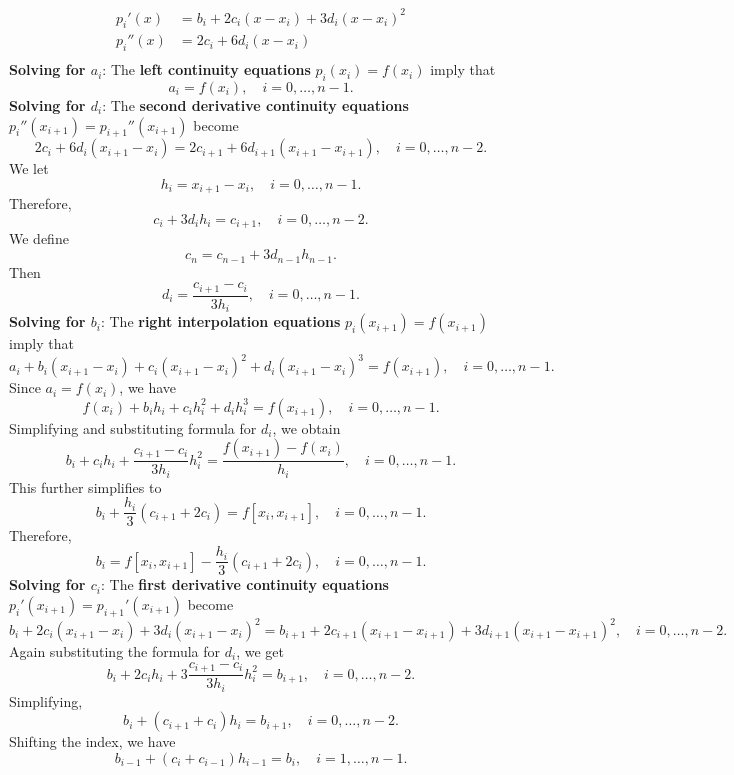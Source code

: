 \documentclass{report}
\begin{document}
\begin{itemize}
\begin{align*}
                p_i'(x) &= b_i + 2c_i(x-x_i) + 3d_i(x-x_i)^2\\
                p_i''(x) &= 2c_i + 6d_i(x-x_i)\\
            \end{align*}
            \textbf{Solving for $a_{i}$}: The \textbf{left continuity equations} $p_i(x_i) = f(x_i)$ imply that
            $$a_i = f(x_i), \quad i=0,\ldots,n-1.$$
            \bigbreak \noindent 
            \textbf{Solving for $d_{i}$}: The \textbf{second derivative continuity equations} $p_i''(x_{i+1}) = p_{i+1}''(x_{i+1})$ become
            $$2c_i + 6d_i(x_{i+1}-x_i) = 2c_{i+1} + 6d_{i+1}(x_{i+1}-x_{i+1}), \quad i=0,\ldots,n-2.$$
            We let 
            $$h_i = x_{i+1} - x_i, \quad i=0,\ldots,n-1.$$ 
            Therefore,
            $$c_i + 3d_i h_i = c_{i+1}, \quad i=0,\ldots,n-2.$$
            We define 
            $$c_n = c_{n-1} + 3d_{n-1} h_{n-1}.$$ 
            Then
            $$d_i = \displaystyle{\frac{c_{i+1} - c_i}{3 h_i}}, \quad i=0,\ldots,n-1.$$
            \bigbreak \noindent 
            \textbf{Solving for $b_{i}$}:
            The \textbf{right interpolation equations} $p_i(x_{i+1}) = f(x_{i+1})$ imply that
            $$a_i + b_i (x_{i+1}-x_i) + c_i (x_{i+1}-x_i)^2 + d_i (x_{i+1}-x_i)^3 = f(x_{i+1}), \quad i=0,\ldots,n-1.$$
            Since $a_i = f(x_i)$, we have
            $$f(x_i) + b_i h_i + c_i h_i^2 + d_i h_i^3 = f(x_{i+1}), \quad i=0,\ldots,n-1.$$
            Simplifying and substituting formula for $d_i$, we obtain
            $$b_i + c_i h_i +  \frac{c_{i+1} - c_i}{3 h_i} h_i^2 = \frac{f(x_{i+1}) - f(x_i)}{h_i}, \quad i=0,\ldots,n-1.$$
            This further simplifies to
            $$b_i + \frac{h_i}{3}(c_{i+1} + 2c_i) = f[x_i,x_{i+1}], \quad i=0,\ldots,n-1.$$
            Therefore,
            $$b_i = f[x_i,x_{i+1}] - \displaystyle{\frac{h_i}{3}}(c_{i+1} + 2c_i), \quad i=0,\ldots,n-1.$$
            \bigbreak \noindent 
            \textbf{Solving for $c_{i}$}:
            The \textbf{first derivative continuity equations} $p_i'(x_{i+1}) = p_{i+1}'(x_{i+1})$ become
            $$b_i + 2c_i(x_{i+1}-x_i) + 3d_i(x_{i+1}-x_i)^2 = b_{i+1} + 2c_{i+1}(x_{i+1}-x_{i+1}) + 3d_{i+1}(x_{i+1}-x_{i+1})^2, \quad i = 0,\ldots,n-2.$$
            Again substituting the formula for $d_i$, we get
            $$b_i + 2c_i h_i + 3\frac{c_{i+1}-c_i}{3h_i} h_i^2 = b_{i+1}, \quad i=0,\ldots,n-2.$$
            Simplifying,
            $$b_i + (c_{i+1}+c_i) h_i = b_{i+1}, \quad i=0,\ldots,n-2.$$
            \bigbreak \noindent 
            Shifting the index, we have
            $$b_{i-1} + (c_{i}+c_{i-1}) h_{i-1} = b_{i}, \quad i=1,\ldots,n-1.$$

\end{itemize}
\end{document}
